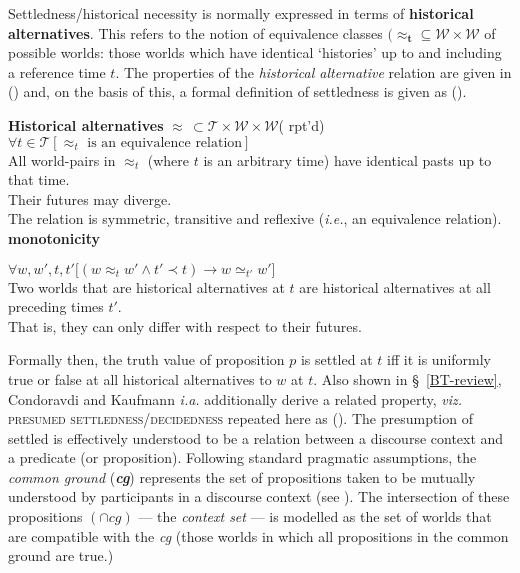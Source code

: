 
Settledness/historical necessity is normally expressed in terms of \textbf{historical alternatives}. This refers to the notion of equivalence classes $\boldsymbol{(\approx_{t}}\subseteq\mathcal{W\times W}$ of possible worlds: those worlds which have identical `histories' up to and including a reference time $t$. The properties of the \textit{historical alternative} relation are given in (\nextx) and, on the basis of this, a formal definition of settledness is given as (\anextx).

\pex\textbf{Historical alternatives }$\boldsymbol\approx\,\subset\mathcal{T\times W\times W}$\trailingcitation( rpt'd)
\a $\forall t\in\mathcal T[\approx_t\text{ is an equivalence relation}]$\\
All world-pairs in $\approx_t$ (where $ t $ is an arbitrary time) have identical pasts up to that time.\\Their futures may diverge.\\
The relation is symmetric, transitive and reflexive (\textit{i.e.}, an equivalence relation).
\a\textbf{monotonicity}

$ \forall w,w',t,t'\big[(w\approx_t w'\wedge t'\prec t)\to w\simeq_{t'} w'\big]$\\
Two worlds that are historical alternatives at $t$ are historical alternatives at all preceding times $t'$.\\That is, they can only differ with respect to their futures.
\xe

Formally then, the truth value of proposition $ p $ is settled at $ t $ iff it is uniformly true or false at all historical alternatives to $ w $ at $ t $. Also shown in \S~\ref{BT-review}, Condoravdi and Kaufmann \textit{i.a.} additionally derive a related property, \textit{viz.} \textsc{presumed settledness/decidedness} repeated here as (). The presumption of settled is effectively understood to be a relation between a discourse context and a predicate (or proposition). Following standard pragmatic assumptions, the \textit{common ground} (\textbf{\textit{cg}}) represents the set of propositions taken to be mutually understood by participants in a discourse context (see ). The intersection of these propositions $ (\cap cg )$ --- the \textit{context set} --- is modelled as the set of worlds that are compatible with the \textit{cg} (those worlds in which all propositions in the common ground are true.)

